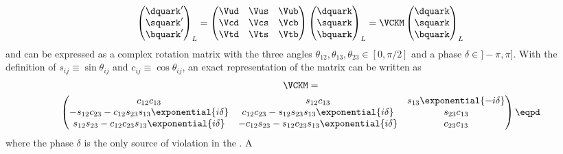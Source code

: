 \begin{equation}
  \begin{pmatrix}
    \dquark^\prime \\
    \squark^\prime \\
    \bquark^\prime \\
  \end{pmatrix}_L
  = 
  \begin{pmatrix}
    \Vud & \Vus & \Vub \\
    \Vcd & \Vcs & \Vcb \\
    \Vtd & \Vts & \Vtb \\
  \end{pmatrix}
  \begin{pmatrix}
    \dquark \\
    \squark \\
    \bquark \\
  \end{pmatrix}_L
  = \VCKM
  \begin{pmatrix}
    \dquark \\
    \squark \\
    \bquark \\
  \end{pmatrix}_L
\end{equation}
%
and can be expressed as a complex rotation matrix with the three angles
$\theta_{12}, \theta_{13}, \theta_{23} \in [0, \pi/2]$ and a phase $\delta \in
]-\pi, \pi]$. With the definition of $s_{ij} \equiv \sin \theta_{ij}$ and
$c_{ij} \equiv \cos \theta_{ij}$, an exact representation \cite{Chau:1984fp} of
the \CKM matrix can be written as
%
\begin{multline}
  \VCKM = \\
  \begin{pmatrix}
    c_{12} c_{13}                                                   & s_{12} c_{13}                                                 & s_{13} \exponential{-i\delta} \\
    -s_{12} c_{23} - c_{12} s_{23} s_{13} \exponential{i\delta}     & c_{12} c_{23} - s_{12} s_{23} s_{13} \exponential{i\delta}    & s_{23} c_{13}                 \\
    s_{12} s_{23} - c_{12} c_{23} s_{13} \exponential{i\delta}      & -c_{12} s_{23} - s_{12} c_{23} s_{13} \exponential{i\delta}   & c_{23} c_{13}                 \\
  \end{pmatrix}\eqpd
\end{multline}
%
where the phase $\delta$ is the only source of \CP violation in the \SM. A
